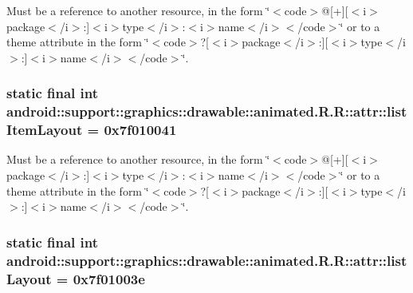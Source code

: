 Must be a reference to another resource, in the form \char`\"{}$<$code$>$@\mbox{[}+\mbox{]}\mbox{[}$<$i$>$package$<$/i$>$:\mbox{]}$<$i$>$type$<$/i$>$:$<$i$>$name$<$/i$>$$<$/code$>$\char`\"{} or to a theme attribute in the form \char`\"{}$<$code$>$?\mbox{[}$<$i$>$package$<$/i$>$:\mbox{]}\mbox{[}$<$i$>$type$<$/i$>$:\mbox{]}$<$i$>$name$<$/i$>$$<$/code$>$\char`\"{}. \hypertarget{classandroid_1_1support_1_1graphics_1_1drawable_1_1animated_1_1_r_1_1attr_df1e2ee90394c9ffa2d58813805b7275}{
\subsubsection[{listItemLayout}]{\setlength{\rightskip}{0pt plus 5cm}static final int android::support::graphics::drawable::animated.R.R::attr::listItemLayout = 0x7f010041}}
\label{classandroid_1_1support_1_1graphics_1_1drawable_1_1animated_1_1_r_1_1attr_df1e2ee90394c9ffa2d58813805b7275}


Must be a reference to another resource, in the form \char`\"{}$<$code$>$@\mbox{[}+\mbox{]}\mbox{[}$<$i$>$package$<$/i$>$:\mbox{]}$<$i$>$type$<$/i$>$:$<$i$>$name$<$/i$>$$<$/code$>$\char`\"{} or to a theme attribute in the form \char`\"{}$<$code$>$?\mbox{[}$<$i$>$package$<$/i$>$:\mbox{]}\mbox{[}$<$i$>$type$<$/i$>$:\mbox{]}$<$i$>$name$<$/i$>$$<$/code$>$\char`\"{}. \hypertarget{classandroid_1_1support_1_1graphics_1_1drawable_1_1animated_1_1_r_1_1attr_9dac64fd3755f57dada2667ad10a2924}{
\subsubsection[{listLayout}]{\setlength{\rightskip}{0pt plus 5cm}static final int android::support::graphics::drawable::animated.R.R::attr::listLayout = 0x7f01003e}}
\label{classandroid_1_1support_1_1graphics_1_1drawable_1_1animated_1_1_r_1_1attr_9dac64fd3755f57dada2667ad10a2924}


